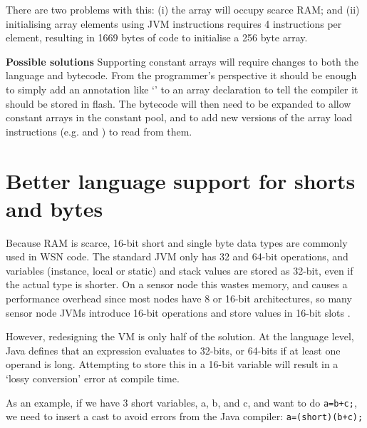 There are two problems with this: (i) the array will occupy scarce RAM; and (ii) initialising array elements using JVM instructions requires 4 instructions per element, resulting in 1669 bytes of code to initialise a 256 byte array.

% 

\textbf{Possible solutions}
Supporting constant arrays will require changes to both the language and bytecode. From the programmer's perspective it should be enough to simply add an annotation like `' to an array declaration to tell the compiler it should be stored in flash. The bytecode will then need to be expanded to allow constant arrays in the constant pool, and to add new versions of the array load instructions (e.g.  and ) to read from them.



\section{Better language support for shorts and bytes}
\label{sec-small-datatypes}
Because RAM is scarce, 16-bit short and single byte data types are commonly used in WSN code. The standard JVM only has 32 and 64-bit operations, and variables (instance, local or static) and stack values are stored as 32-bit, even if the actual type is shorter. On a sensor node this wastes memory, and causes a performance overhead since most nodes have 8 or 16-bit architectures, so many sensor node JVMs introduce 16-bit operations and store values in 16-bit slots \cite{Brouwers:2009cj}.

However, redesigning the VM is only half of the solution. At the language level, Java defines that an expression evaluates to 32-bits, or 64-bits if at least one operand is long. Attempting to store this in a 16-bit variable will result in a `lossy conversion' error at compile time.

As an example, if we have 3 short variables, a, b, and c, and want to do 
\texttt{a=b+c;}, we need to insert a cast to avoid errors from the Java compiler: \texttt{a=(short)(b+c);}

